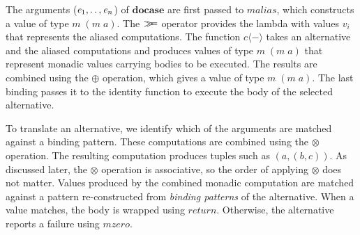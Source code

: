 \documentclass{sigplanconf}
\newcommand{\Varid}[1]{\mathit{#1}}
\newcommand{\bind}{\mathbin{>\!\!\!>\mkern-6.7mu=}}
\begin{document}
The arguments (\ensuremath{\Varid{e} _{\mathrm{1}},\mathinner{\ldotp\ldotp},\Varid{e} _{\Varid{n}}}) of \ensuremath{\mathbf{docase}} are first passed to \ensuremath{\Varid{malias}}, which
constructs a value of type \ensuremath{\Varid{m}\;(\Varid{m}\;\Varid{a})}. The \ensuremath{\bind } operator provides the lambda with 
values \ensuremath{\Varid{v} _{\Varid{i}}} that represents the aliased computations. The function \ensuremath{\Varid{c} \mathopen{\langle} \mathbin{-}\mathclose{\rangle} } takes an alternative
and the aliased computations and produces values of type \ensuremath{\Varid{m}\;(\Varid{m}\;\Varid{a})} that represent monadic values 
carrying bodies to be executed. The results are combined using the \ensuremath{\oplus} operation, which 
gives a value of type \ensuremath{\Varid{m}\;(\Varid{m}\;\Varid{a})}. The last binding passes it to the identity function to execute 
the body of the selected alternative.

To translate an alternative, we identify which of the arguments are matched against
a binding pattern. These computations are combined using the \ensuremath{\otimes} operation. The resulting 
computation produces tuples such as \ensuremath{(\Varid{a},(\Varid{b},\Varid{c}))}. As discussed later, the \ensuremath{\otimes} operation is 
associative, so the order of applying \ensuremath{\otimes} does not matter. Values produced by the combined monadic computation 
are matched against a pattern re-constructed from \textit{binding patterns} of the alternative. 
When a value matches, the body is wrapped using \ensuremath{\Varid{return}}. Otherwise, the alternative 
reports a failure using \ensuremath{\Varid{mzero}}.

\end{document}
